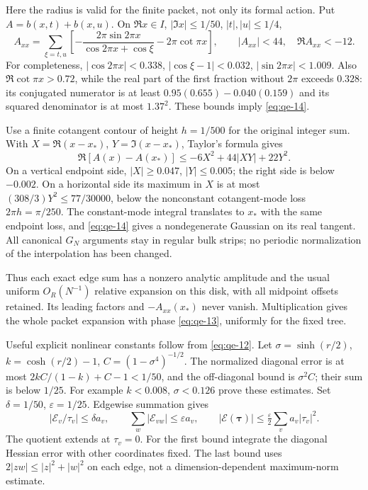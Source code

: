 Here the radius is valid for the finite packet, not only its formal action. Put \(A=b(x,t)+b(x,u)\). On \(\Re x\in I\), \(|\Im x|\le1/50\), \(|t|,|u|\le1/4\),
\begin{equation}
A_{xx}=\sum_{\xi=t,u}
 \left[-\frac{2\pi\sin2\pi x}{\cos2\pi x+\cos\xi}
                                    -2\pi\cot\pi x\right],
 \qquad |A_{xx}|<44,\quad \Re A_{xx}<-12.
\label{eq:qe-14}
\end{equation}
For completeness, \(|\cos2\pi x|<0.338\), \(|\cos\xi-1|<0.032\), \(|\sin2\pi x|<1.009\). Also \(\Re\cot\pi x>0.72\), while the real part of the first fraction without \(2\pi\) exceeds \(0.328\): its conjugated numerator is at least \(0.95(0.655)-0.040(0.159)\) and its squared denominator is at most \(1.37^2\). These bounds imply \eqref{eq:qe-14}.

Use a finite cotangent contour of height \(h=1/500\) for the original integer sum. With \(X=\Re(x-x_*)\), \(Y=\Im(x-x_*)\), Taylor's formula gives
\begin{equation}
\Re[A(x)-A(x_*)]\le-6X^2+44|XY|+22Y^2.
\label{eq:qe-15}
\end{equation}
On a vertical endpoint side, \(|X|\ge0.047\), \(|Y|\le0.005\); the right side is below \(-0.002\). On a horizontal side its maximum in \(X\) is at most \((308/3)Y^2\le77/30000\), below the nonconstant cotangent-mode loss \(2\pi h=\pi/250\). The constant-mode integral translates to \(x_*\) with the same endpoint loss, and \eqref{eq:qe-14} gives a nondegenerate Gaussian on its real tangent. All canonical \(G_N\) arguments stay in regular bulk strips; no periodic normalization of the interpolation has been changed.

Thus each exact edge sum has a nonzero analytic amplitude and the usual uniform \(O_R(N^{-1})\) relative expansion on this disk, with all midpoint offsets retained. Its leading factors and \(-A_{xx}(x_*)\) never vanish. Multiplication gives the whole packet expansion with phase \eqref{eq:qe-13}, uniformly for the fixed tree.

Useful explicit nonlinear constants follow from \eqref{eq:qe-12}. Let \(\sigma=\sinh(r/2)\), \(k=\cosh(r/2)-1\), \(C=(1-\sigma^4)^{-1/2}\). The normalized diagonal error is at most \(2kC/(1-k)+C-1<1/50\), and the off-diagonal bound is \(\sigma^2C\); their sum is below \(1/25\). For example \(k<0.008\), \(\sigma<0.126\) prove these estimates. Set \(\delta=1/50\), \(\varepsilon=1/25\). Edgewise summation gives
\begin{equation}
\left|\mathcal E_v/\tau_v\right|\le\delta a_v,\qquad
 \sum_w|\mathcal E_{vw}|\le\varepsilon a_v,\qquad
 |\mathcal E(\boldsymbol\tau)|
                      \le\tfrac\varepsilon2\sum_va_v|\tau_v|^2.
\label{eq:qe-16}
\end{equation}
The quotient extends at \(\tau_v=0\). For the first bound integrate the diagonal Hessian error with other coordinates fixed. The last bound uses \(2|zw|\le|z|^2+|w|^2\) on each edge, not a dimension-dependent maximum-norm estimate.

